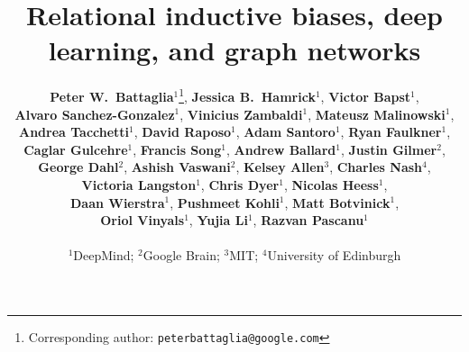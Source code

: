 \documentclass[twoside,11pt]{article}
\begin{document}
\title{Relational inductive biases, deep learning, and graph networks}
\author{
    \normalsize
    \textbf{Peter W.~Battaglia}$^1$\footnote{Corresponding author: \texttt{peterbattaglia@google.com}},
    \textbf{Jessica B.~Hamrick}$^1$,
    \textbf{Victor Bapst}$^1$,\\
    \normalsize
    \textbf{Alvaro Sanchez-Gonzalez}$^1$,
    \textbf{Vinicius Zambaldi}$^1$,
    \textbf{Mateusz Malinowski}$^1$,\\
    \normalsize
    \textbf{Andrea Tacchetti}$^1$,
    \textbf{David Raposo}$^1$,
    \textbf{Adam Santoro}$^1$,
    \textbf{Ryan Faulkner}$^1$,\\
    \normalsize
    \textbf{Caglar Gulcehre}$^1$,
    \textbf{Francis Song}$^1$,
    \textbf{Andrew Ballard}$^1$,
    \textbf{Justin Gilmer}$^2$,\\
    \normalsize
    \textbf{George Dahl}$^2$,
    \textbf{Ashish Vaswani}$^2$,
    \textbf{Kelsey Allen}$^3$,
    \textbf{Charles Nash}$^4$,\\
    \normalsize
    \textbf{Victoria Langston}$^1$,
    \textbf{Chris Dyer}$^1$,
    \textbf{Nicolas Heess}$^1$,\\
    \normalsize
    \textbf{Daan Wierstra}$^1$,
    \textbf{Pushmeet Kohli}$^1$,
    \textbf{Matt Botvinick}$^1$,\\
    \normalsize
    \textbf{Oriol Vinyals}$^1$,
    \textbf{Yujia Li}$^1$,
    \textbf{Razvan Pascanu}$^1$\\
    \\
    \normalsize
    $^1$DeepMind; $^2$Google Brain; $^3$MIT; $^4$University of Edinburgh
}
\date{\vspace{-5ex}}
\maketitle



\nocite{zugner2018adversarial}

\vskip 0.2in



\newpage

\end{document}
